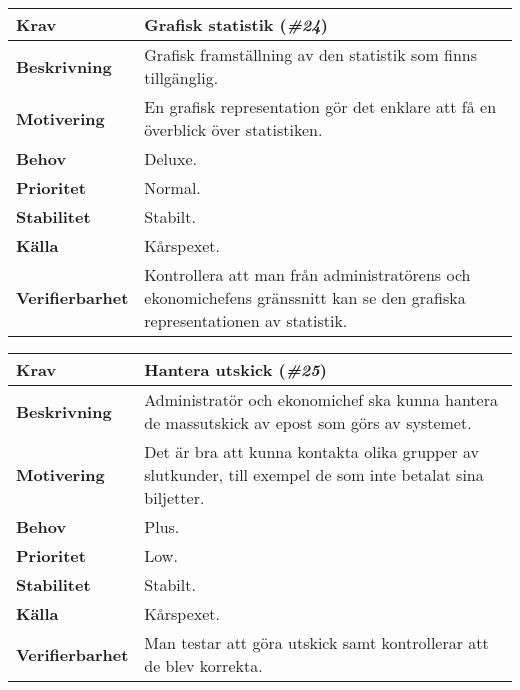 \documentclass[a4paper, twoside, 11pt, titlepage]{article}
\begin{document}
		\begin{tabular} { p{2.6cm} p{12.5cm} }
			\hline
			\sffamily\textbf{Krav} & Grafisk statistik (\emph{\#24})  \\
			\hline
			\sffamily\textbf{Beskrivning} & Grafisk framställning av den statistik som finns tillgänglig.  \\
			\hline
			\sffamily\textbf{Motivering} & En grafisk representation gör det enklare att få en överblick över statistiken.  \\
			\hline
			\sffamily\textbf{Behov} & Deluxe.  \\
			\hline
			\sffamily\textbf{Prioritet} & Normal.  \\
			\hline
			\sffamily\textbf{Stabilitet} & Stabilt.  \\
			\hline
			\sffamily\textbf{Källa} & Kårspexet.  \\
			\hline
			\sffamily\textbf{Verifierbarhet} & Kontrollera att man från administratörens och ekonomichefens gränssnitt kan se den grafiska representationen av statistik.  \\
			\hline
		\end{tabular}
		\vspace{6mm}

		\begin{tabular} { p{2.6cm} p{12.5cm} }
			\hline
			\sffamily\textbf{Krav} & Hantera utskick (\emph{\#25})  \\
			\hline
			\sffamily\textbf{Beskrivning} & Administratör och ekonomichef ska kunna hantera de massutskick av epost som görs av systemet.  \\
			\hline
			\sffamily\textbf{Motivering} & Det är bra att kunna kontakta olika grupper av slutkunder, till exempel de som inte betalat sina biljetter.  \\
			\hline
			\sffamily\textbf{Behov} & Plus.  \\
			\hline
			\sffamily\textbf{Prioritet} & Low.  \\
			\hline
			\sffamily\textbf{Stabilitet} & Stabilt.  \\
			\hline
			\sffamily\textbf{Källa} & Kårspexet.  \\
			\hline
			\sffamily\textbf{Verifierbarhet} & Man testar att göra utskick samt kontrollerar att de blev korrekta.  \\
			\hline
		\end{tabular}
		\vspace{6mm}
\end{document}

